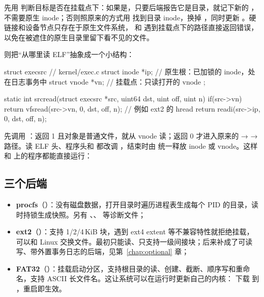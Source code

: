  先用  判断目标是否在挂载点下：如果是，只要后端报告它是目录，就记下新的 ，不需要原生 inode；否则照原来的方式用  找到目录 inode，换掉 ，同时更新 。硬链接和设备节点只存在于原生文件系统， 和  遇到挂载点下的路径直接返回错误，以免在被遮住的原生目录里留下看不见的文件。

 则把“从哪里读 ELF”抽象成一个小结构：

\begin{ccode}
struct execsrc {                 // kernel/exec.c
  struct inode *ip;              // 原生根：已加锁的 inode，处在日志事务中
  struct vnode *vn;              // 挂载点：只读打开的 vnode
};

static int srcread(struct execsrc *src, uint64 dst, uint off, uint n) {
  if(src->vn)
    return vfsread(src->vn, 0, dst, off, n);   // 例如 ext2 的 hread
  return readi(src->ip, 0, dst, off, n);
}
\end{ccode}

 先调用 ：返回 1 且对象是普通文件，就从 vnode 读；返回 0 才进入原来的  →  →  路径。读 ELF 头、程序头和  都改调 ，结束时由  统一释放 inode 或 vnode。这样  和  上的程序都能直接运行：


\subsection{三个后端}

\begin{itemize}
  \item \textbf{procfs}（）：没有磁盘数据，打开目录时遍历进程表生成每个 PID 的目录，读  时持锁生成快照。另有 、、 等诊断文件；
  \item \textbf{ext2}（）：支持 1/2/4\,KiB 块，遇到 ext4 extent 等不兼容特性就拒绝挂载，可以和 Linux 交换文件。最初只能读、只支持一级间接块；后来补成了可读写、带外置事务日志的后端，见第~\ref{chap:optional} 章；
  \item \textbf{FAT32}（）：挂载启动分区，支持根目录的读、创建、截断、顺序写和重命名，支持 ASCII 长文件名。这让系统可以在运行时更新自己的内核： 下载  到 ，重启即生效。
\end{itemize}

